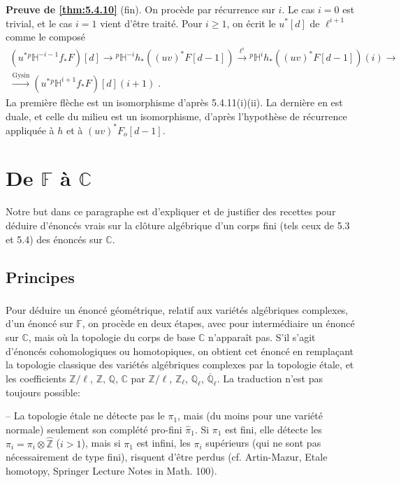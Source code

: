 \documentclass[12pt,a4paper]{article}
\theoremstyle{plain}
\theoremstyle{definition}
\theoremstyle{remark}
\newcommand{\CC}{\mathbb{C}}
\newcommand{\FF}{\mathbb{F}}
\newcommand{\HH}{\mathbb{H}}
\newcommand{\QQ}{\mathbb{Q}}
\newcommand{\ZZ}{\mathbb{Z}}
\begin{document}
\subsubsection{}
\textbf{Preuve de \ref{thm:5.4.10}} (fin). On proc\`ede par r\'ecurrence sur $i$. Le cas $i = 0$ est trivial, et le cas $i = 1$ vient d'\^etre trait\'e. Pour $i \geq 1$, on \'ecrit le $u^*[d]$ de $\ell^{i+1}$ comme le compos\'e
\begin{multline*}
(u^*{}^{p}\HH^{-i-1}f_*F)[d] \to {}^{p}\HH^{-i}h_*((uv)^*F[d-1]) \xrightarrow{\ell^i} {}^{p}\HH^ih_*((uv)^*F[d-1])(i) \to \\
\xrightarrow{\text{Gysin}} (u^*{}^{p}\HH^{i+1}f_*F)[d](i+1)\;.
\end{multline*}
La premi\`ere fl\`eche est un isomorphisme d'apr\`es 5.4.11(i)(ii). La derni\`ere en est duale, et celle du milieu est un isomorphisme, d'apr\`es l'hypoth\`ese de r\'ecurrence appliqu\'ee \`a $h$ et \`a $(uv)^*F_o[d-1]$.

\section{De $\FF$ \`a $\CC$}

Notre but dans ce paragraphe est d'expliquer et de justifier des recettes pour d\'eduire d'\'enonc\'es vrais sur la cl\^oture alg\'ebrique d'un corps fini (tels ceux de 5.3 et 5.4) des \'enonc\'es sur $\CC$.

\subsection{Principes}

\subsubsection{}
Pour d\'eduire un \'enonc\'e g\'eom\'etrique, relatif aux vari\'et\'es alg\'ebriques complexes, d'un \'enonc\'e sur $\FF$, on proc\`ede en deux \'etapes, avec pour interm\'ediaire un \'enonc\'e sur $\CC$, mais o\`u la topologie du corps de base $\CC$ n'appara\^it pas. S'il s'agit d'\'enonc\'es cohomologiques ou homotopiques, on obtient cet \'enonc\'e en rempla\c{c}ant la topologie classique des vari\'et\'es alg\'ebriques complexes par la topologie \'etale, et les coefficients $\ZZ/\ell$, $\ZZ$, $\QQ$, $\CC$ par $\ZZ/\ell$, $\ZZ_{\ell}$, $\QQ_{\ell}$, $\overline{\QQ}_{\ell}$. La traduction n'est pas toujours possible:

-- La topologie \'etale ne d\'etecte pas le $\pi_1$, mais (du moins pour une vari\'et\'e normale) seulement son compl\'et\'e pro-fini $\hat{\pi}_1$. Si $\pi_1$ est fini, elle d\'etecte les $\pi_i = \pi_i \otimes \hat{\ZZ}$ ($i > 1$), mais si $\pi_1$ est infini, les $\pi_i$ sup\'erieurs (qui ne sont pas n\'ecessairement de type fini), risquent d'\^etre perdus (cf. Artin-Mazur, Etale homotopy, Springer Lecture Notes in Math. 100).
\end{document}
